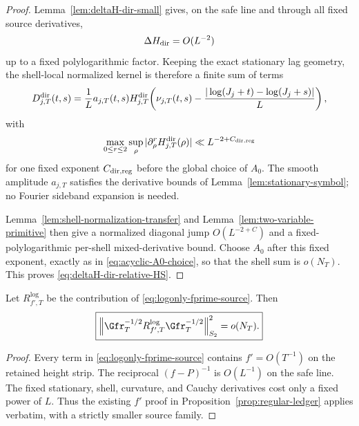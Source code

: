 \begin{proof}
Lemma~\ref{lem:deltaH-dir-small} gives, on the safe line and through all fixed
source derivatives,
\[
\Delta H_{\rm dir}=O(L^{-2})
\]
up to a fixed polylogarithmic factor.  Keeping the exact stationary lag
geometry, the shell-local normalized kernel is therefore a finite sum of terms
\begin{equation}
D_{j,T}^{\rm dir}(t,s)
=\frac1L a_{j,T}(t,s)
H_{j,T}^{\rm dir}\!\left(
\nu_{j,T}(t,s)-
\frac{|\log(J_j+t)-\log(J_j+s)|}{L}
\right),
\label{eq:deltaH-dir-shell-kernel}
\end{equation}
with
\begin{equation}
\max_{0\le r\le2}\sup_\rho
|\partial_\rho^rH_{j,T}^{\rm dir}(\rho)|
\ll L^{-2+C_{\rm dir,reg}}
\label{eq:deltaH-dir-profile-bound}
\end{equation}
for one fixed exponent $C_{\rm dir,reg}$ before the global choice of $A_0$.
The smooth amplitude $a_{j,T}$ satisfies the derivative bounds of
Lemma~\ref{lem:stationary-symbol}; no Fourier sideband expansion is needed.

Lemma~\ref{lem:shell-normalization-transfer} and
Lemma~\ref{lem:two-variable-primitive} then give a normalized diagonal jump
$O(L^{-2+C})$ and a fixed-polylogarithmic per-shell mixed-derivative bound.
Choose $A_0$ after this fixed exponent, exactly as in
\eqref{eq:acyclic-A0-choice}, so that the shell sum is $o(N_T)$.  This proves
\eqref{eq:deltaH-dir-relative-HS}.
\end{proof}

\begin{lemma}
\label{lem:logonly-fprime-relative-regular}
Let $R_{f',T}^{\log}$ be the contribution of
\eqref{eq:logonly-fprime-source}.  Then
\begin{equation}
\boxed{
\left\|\Gfr_T^{-1/2}R_{f',T}^{\log}\Gfr_T^{-1/2}\right\|_{S_2}^2
=o(N_T).
}
\label{eq:logonly-fprime-relative-HS}
\end{equation}
\end{lemma}

\begin{proof}
Every term in \eqref{eq:logonly-fprime-source} contains $f'=O(T^{-1})$ on the
retained height strip.  The reciprocal $(f-P)^{-1}$ is $O(L^{-1})$ on the safe
line.  The fixed stationary, shell, curvature, and Cauchy derivatives cost only
a fixed power of $L$.  Thus the existing $f'$ proof in
Proposition~\ref{prop:regular-ledger} applies verbatim, with a strictly smaller
source family.
\end{proof}

